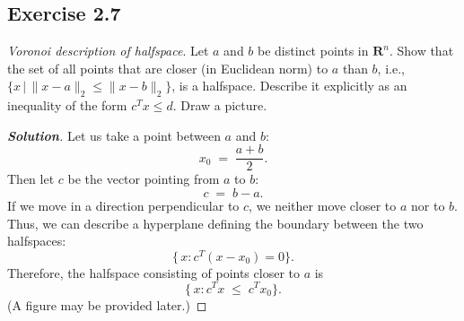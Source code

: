 \documentclass[12pt]{article}
\newenvironment{Solution}
  {\begin{proof}[\textbf{Solution}]}
  {\end{proof}}
\begin{document}
\vspace{0.15in}

\subsection*{Exercise 2.7}
\textit{Voronoi description of halfspace}. Let \(a\) and \(b\) be distinct points in $\mathbf{R}^n$.
Show that the set of all points that are closer (in Euclidean norm) to \(a\) than \(b\), i.e., $\{x \, | \, \| x - a \|_2 \leq \| x - b \|_2\}$,
is a halfspace. Describe it explicitly as an inequality of the form $c^T x \leq d$. Draw a picture.
\begin{Solution}
	Let us take a point between \(a\) and \(b\):
	\[
		x_0 \;=\; \frac{a+b}{2}.
	\]
	Then let \(c\) be the vector pointing from \(a\) to \(b\):
	\[
		c \;=\; b - a.
	\]
	If we move in a direction perpendicular to \(c\), we neither move closer to \(a\) nor to \(b\). Thus, we can describe a hyperplane defining the boundary between the two halfspaces:
	\[
		\{\,x : c^T (x - x_0) = 0\}.
	\]
	Therefore, the halfspace consisting of points closer to \(a\) is
	\[
		\{\,x : c^T x \;\le\; c^T x_0\}.
	\]
	(A figure may be provided later.)
\end{Solution}



\vspace{0.15in}
\end{document}
